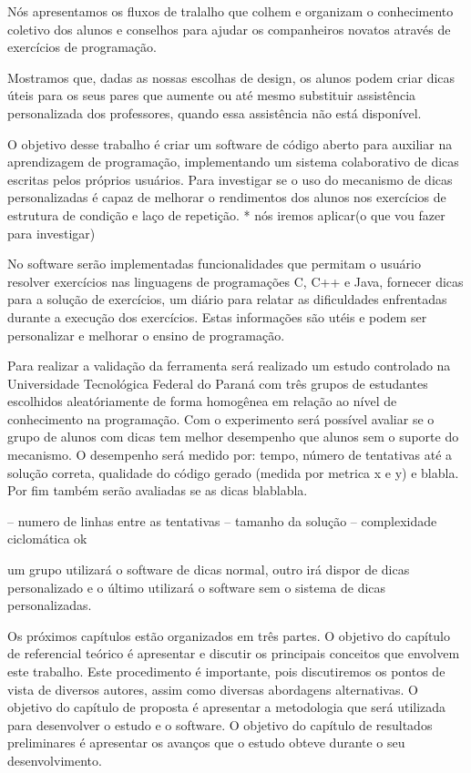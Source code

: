 Nós apresentamos os fluxos de tralalho que colhem e organizam o conhecimento coletivo dos alunos e conselhos para ajudar os companheiros novatos através de exercícios de programação. 


Mostramos que, dadas as nossas escolhas de design, os alunos podem criar dicas úteis para os seus pares que aumente ou até mesmo substituir assistência personalizada dos professores, quando essa assistência não está disponível.



O objetivo desse trabalho é criar um software de código aberto para auxiliar na aprendizagem de programação, implementando um sistema colaborativo de dicas escritas pelos próprios usuários. Para investigar se o uso do mecanismo de dicas personalizadas é capaz de melhorar o rendimentos dos alunos nos exercícios de estrutura de condição e laço de repetição. * nós iremos aplicar(o que vou fazer para investigar)

No software serão implementadas funcionalidades que permitam o usuário resolver exercícios nas linguagens de programações C, C++ e Java, fornecer dicas para a solução de exercícios, um diário para relatar as dificuldades enfrentadas durante a execução dos exercícios. Estas informações são utéis e podem ser personalizar e melhorar o ensino de programação.

Para realizar a validação da ferramenta será realizado um estudo controlado na Universidade Tecnológica Federal do Paraná com três grupos de estudantes escolhidos aleatóriamente de forma homogênea em relação ao nível de conhecimento na programação. Com o experimento será possível avaliar se o grupo de alunos com dicas tem melhor desempenho que alunos sem o suporte do mecanismo. O desempenho será medido por: tempo, número de tentativas até a solução correta, qualidade do código gerado (medida por metrica x e y) e blabla. Por fim também serão avaliadas se as dicas blablabla.

-- numero de linhas entre as tentativas
-- tamanho da solução
-- complexidade ciclomática ok


um grupo utilizará o software de dicas normal, outro irá dispor de dicas personalizado e o último utilizará o software sem o sistema de dicas personalizadas.


Os próximos capítulos estão organizados em três partes. O objetivo do capítulo de referencial teórico é apresentar e discutir os principais conceitos que envolvem este trabalho. Este  procedimento é importante, pois discutiremos os pontos de vista de diversos autores, assim como diversas abordagens alternativas. O objetivo do capítulo de proposta é apresentar a metodologia que será utilizada para desenvolver o estudo e o software. O objetivo do capítulo de resultados preliminares é apresentar os avanços que o estudo obteve durante o seu desenvolvimento.




